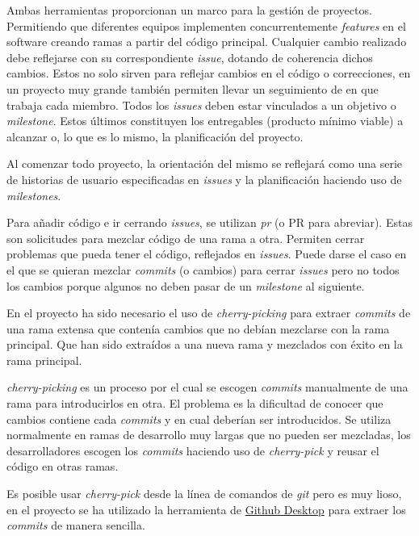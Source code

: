 \begin{enumerate}
Ambas herramientas proporcionan un marco para la gestión de proyectos. Permitiendo que diferentes equipos implementen concurrentemente \emph{features} en el software creando ramas a partir del código principal. Cualquier cambio realizado debe reflejarse con su correspondiente \emph{\gls{issue}}, dotando de coherencia dichos cambios. Estos no solo sirven para reflejar cambios en el código o correcciones, en un proyecto muy grande también permiten llevar un seguimiento de en que trabaja cada miembro. Todos los \emph{\glspl{issue}} deben estar vinculados a un objetivo o \emph{\gls{milestone}}. Estos últimos constituyen los entregables (producto mínimo viable) a alcanzar o, lo que es lo mismo, la planificación del proyecto.

Al comenzar todo proyecto, la orientación del mismo se reflejará como una serie de historias de usuario especificadas en \emph{\glspl{issue}} y la planificación haciendo uso de \emph{\glspl{milestone}}.

Para añadir código e ir cerrando \emph{\glspl{issue}}, se utilizan \emph{\gls{pr}} (o PR para abreviar). Estas son solicitudes para mezclar código de una rama a otra. Permiten cerrar problemas que pueda tener el código, reflejados en \emph{issues}. Puede darse el caso en el que se quieran mezclar \emph{\glspl{commit}} (o cambios) para cerrar \emph{\glspl{issue}} pero no todos los cambios porque algunos no deben pasar de un \emph{\gls{milestone}} al siguiente.

En el proyecto ha sido necesario el uso de \emph{\gls{cherry-picking}} para extraer \emph{\glspl{commit}} de una rama extensa que contenía cambios que no debían mezclarse con la rama principal. Que han sido extraídos a una nueva rama y mezclados con éxito en la rama principal.

\emph{\gls{cherry-picking}} es un proceso por el cual se escogen \emph{\glspl{commit}} manualmente de una rama para introducirlos en otra. El problema es la dificultad de conocer que cambios contiene cada \emph{\glspl{commit}} y en cual deberían ser introducidos. Se utiliza normalmente en ramas de desarrollo muy largas que no pueden ser mezcladas, los desarrolladores escogen los \emph{\glspl{commit}} haciendo uso de \emph{cherry-pick} y reusar el código en otras ramas.\cite{bunyakiati2017cherry}

Es posible usar \emph{cherry-pick} desde la línea de comandos de \emph{\Gls{git}} pero es muy lioso, en el proyecto se ha utilizado la herramienta de \href{https://desktop.github.com/}{Github Desktop} para extraer los \emph{\glspl{commit}} de manera sencilla.


\end{enumerate}
